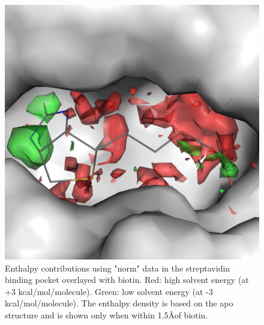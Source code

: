 \documentclass[9pt,tutorial]{livecoms}
\begin{document}
\begin{figure}
	\centering
	\includegraphics[width=0.8\linewidth]{figures/binding_pocket_norm_quants.png}
	\caption{Enthalpy contributions using "norm" data in the streptavidin binding pocket overlayed with biotin. Red: high solvent energy (at +3 
	kcal/mol/molecule). Green: low solvent energy (at -3 kcal/mol/molecule). The enthalpy density is based on the apo structure and is shown only when within 1.5\AA of biotin.}\label{fig_binding_pocket_pymol}
\end{figure}
\end{document}
